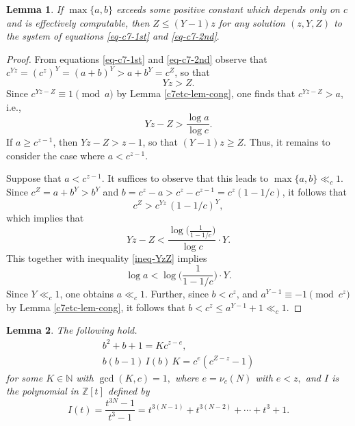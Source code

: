 \documentclass[11pt]{amsart}
\newtheorem{lem}{Lemma}[section]
\numberwithin{equation}{section}
\begin{document}
\begin{lem}\label{c7etc-lem-lb-Z/z}
If $\max\{a,b\}$ exceeds some positive constant which depends only on $c$ and is effectively computable, then $Z \le (Y-1)z$ for any solution $(z,Y,Z)$ to the system of equations \eqref{eq-c7-1st} and \eqref{eq-c7-2nd}$.$ 
\end{lem}

\begin{proof}
From equations \eqref{eq-c7-1st} and \eqref{eq-c7-2nd} observe that $c^{Y z}=(c^z)^Y=(a+b)^Y>a+b^Y=c^Z$, so that 
\[
Y z>Z.
\]
Since $c^{Y z-Z} \equiv 1 \pmod{a}$ by Lemma \ref{c7etc-lem-cong}, one finds that $c^{Y z-Z}>a$, i.e., 
\begin{equation}\label{ineq-YzZ}
Y z-Z>\frac{\log a}{\log c}.
\end{equation}
If $a \ge c^{z-1}$, then $Y z-Z>z-1$, so that $(Y-1)z \ge Z$.
Thus, it remains to consider the case where $a<c^{z-1}$.

Suppose that $a<c^{z-1}$.
It suffices to observe that this leads to $\max\{a,b\} \ll_{c} 1$.
Since $c^Z = a+b^Y > b^Y$ and $b=c^z-a>c^z-c^{z-1}=c^z (1-1/c)$, it follows that
\[
c^Z > c^{Y z}\,(1-1/c)^Y, 
\]
which implies that
\[
Y z-Z<\frac{\log\bigr(\frac{1}{1-1/c}\bigr)}{\log c} \cdot Y.
\]
This together with inequality \eqref{ineq-YzZ} implies
\[
\log a<\log\biggr(\frac{1}{1-1/c}\bigg)\cdot Y.
\]
Since $Y \ll_c 1$, one obtains $a \ll_{c} 1$.
Further, since $b<c^z$, and $a^{Y-1} \equiv -1 \pmod{c^z}$ by Lemma \ref{c7etc-lem-cong}, it follows that $b<c^z \le a^{Y-1}+1 \ll_{c} 1$.
\end{proof}

\begin{lem}\label{c7etc-lem-Krelations}
The following hold.
\begin{gather}
b^2+b+1=K c^{z-e}, \label{c7etc-rel1}\\
b(b-1)\,I(b)\,K=c^e(c^{Z-z}-1) \label{c7etc-rel2}
\end{gather}
for some $K \in \mathbb N$ with $\gcd(K,c)=1,$ where $e=\nu_{c}(N)$ with $e<z,$ and $I$ is the polynomial in $\mathbb Z[t]$ defined by
\[
I(t)=\frac{t^{3N}-1}{t^3-1}=t^{3(N-1)}+t^{3(N-2)}+ \cdots +t^3 +1.
\]
\end{lem}
\end{document}
